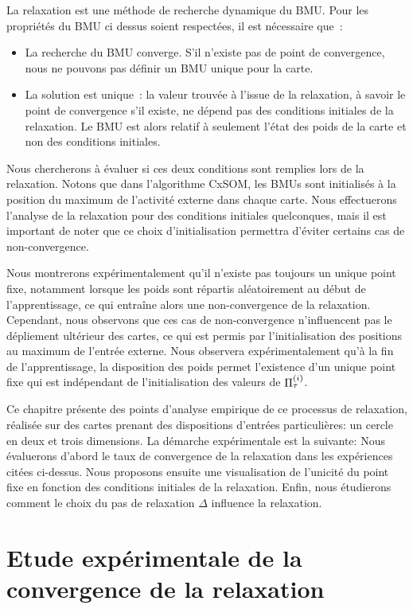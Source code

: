 \documentclass[../main]{subfiles}
\begin{document}
La relaxation est une méthode de recherche dynamique du BMU. Pour les propriétés du BMU ci dessus soient respectées, il est nécessaire que~: 
\begin{itemize}
	\item La recherche du BMU converge. S'il n'existe pas de point de convergence, nous ne pouvons pas définir un BMU unique pour la carte. 
	\item La solution est unique~: la valeur trouvée à l'issue de la relaxation, à savoir le point de convergence s'il existe, ne dépend pas des conditions initiales de la relaxation. Le BMU est alors relatif à seulement l'état des poids de la carte et non des conditions initiales.
\end{itemize}

Nous chercherons à évaluer si ces deux conditions sont remplies lors de la relaxation.
Notons que dans l'algorithme CxSOM, les BMUs sont initialisés à la position du maximum de l'activité externe dans chaque carte. 
Nous effectuerons l'analyse de la relaxation pour des conditions initiales quelconques, mais il est important de noter que ce choix d'initialisation permettra d'éviter certains cas de non-convergence.

Nous montrerons expérimentalement qu'il n'existe pas toujours un unique point fixe, notamment lorsque les poids sont répartis aléatoirement au début de l'apprentissage, ce qui entraîne alors une non-convergence de la relaxation. 
Cependant, nous observons que ces cas de non-convergence n'influencent pas le dépliement ultérieur des cartes, ce qui est permis par l'initialisation des positions au maximum de l'entrée externe.
Nous observera expérimentalement qu'à la fin de l'apprentissage, la disposition des poids permet l'existence d'un unique point fixe qui est indépendant de l'initialisation des valeurs de $\Pi^{({i})}_{\tau}$.

Ce chapitre présente des points d'analyse empirique de ce processus de relaxation, réalisée sur des cartes prenant des dispositions d'entrées particulières: un cercle en deux et trois dimensions.
La démarche expérimentale est la suivante:
Nous évaluerons d'abord le taux de convergence de la relaxation dans les expériences citées ci-dessus.
Nous proposons ensuite une visualisation de l'unicité du point fixe en fonction des conditions initiales de la relaxation. Enfin, nous étudierons comment le choix du pas de relaxation $\Delta$ influence la relaxation.

\section{Etude expérimentale de la convergence de la relaxation}
\end{document}
